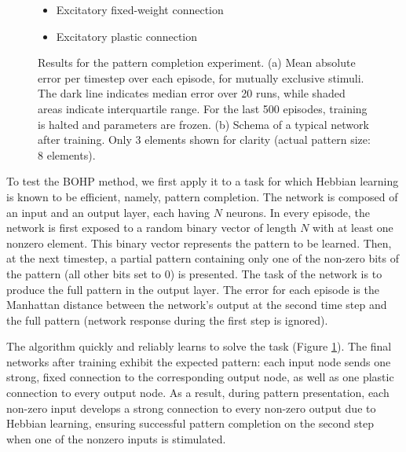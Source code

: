 \documentclass{article}
\begin{document}
\begin{figure}
\begin{subfigure}[t]{0.25\textwidth}
\end{subfigure}
\begin{minipage}[b]{0.25\textwidth}
\centering
\noindent
\begin{itemize}[leftmargin=*] %
\item[]\tikz{\path[very thick,->,draw=black] %
        (0,0) -- (1,0) ;}Excitatory fixed-weight connection
\item[]\tikz{\path[very thick,->,dashed,draw=black] %
        (0,0) -- (1,0) ;}Excitatory plastic connection
\end{itemize}
\end{minipage}
\caption{Results for the pattern completion experiment. (a) Mean absolute error per timestep over each episode, for mutually
exclusive stimuli. The dark line indicates median error
over 20 runs, while shaded areas indicate interquartile range. For the last 500
episodes, training is halted and parameters are frozen. (b) Schema of a
typical network after training. Only 3 elements shown for clarity (actual
pattern size: 8 elements). }
\label{fig:completion}
\end{figure}


To test the BOHP method, we first apply it to a task for which Hebbian learning
is known to be efficient, namely, pattern completion. The network is composed
of an input and an output layer, each having $N$ neurons.  In every episode,
the network is first exposed to a random binary vector of length $N$ with at
least one nonzero element. This binary vector represents the pattern to be
learned.  Then, at the next timestep, a partial pattern containing only one of
the non-zero bits of the pattern (all other bits set to 0) is presented. The
task of the network is to produce the full pattern in the output layer. The
error for each episode is the Manhattan distance between the network's output
at the second time step and the full pattern (network response during the first
step is ignored).


The algorithm quickly and reliably learns to solve the task (Figure
\ref{fig:completion}). The final networks
after training exhibit the expected pattern: each input node sends one strong,
fixed connection to the corresponding output node, as well as one plastic
connection to every output node. As a result, during pattern presentation, each
non-zero input develops a strong connection to every non-zero output due to
Hebbian learning, ensuring successful pattern completion on the second step when
one of the nonzero inputs is stimulated. 
\end{document}
